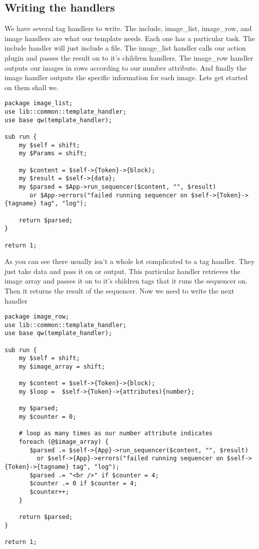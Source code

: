 \subsection{Writing the handlers}
We have several tag handlers to write. The include, image\_list, image\_row, and image handlers are what our template needs. Each one has a particular task. The include handler will just include a file. The image\_list handler calls our action plugin and passes the result on to it's children handlers. The image\_row handler outputs our images in rows according to our number attribute. And finally the image handler outputs the specific information for each image. Lets get started on them shall we.
\begin{verbatim}
package image_list;
use lib::common::template_handler;
use base qw(template_handler);

sub run {
    my $self = shift;
    my $Params = shift;
    
    my $content = $self->{Token}->{block);
    my $result = $self->{data};
    my $parsed = $App->run_sequencer($content, "", $result)
       or $App->errors("failed running sequencer on $self->{Token}->{tagname} tag", "log");
    
    return $parsed;
}

return 1;
\end{verbatim}
As you can see there usually isn't a whole lot complicated to a tag handler. They just take data and pass it on or output. This particular handler retrieves the image array and passes it on to it's children tags that it runs the sequencer on. Then it returns the result of the sequencer. Now we need to write the next handler
\begin{verbatim}
package image_row;
use lib::common::template_handler;
use base qw(template_handler);

sub run {
    my $self = shift;
    my $image_array = shift;
    
    my $content = $self->{Token}->{block);
    my $loop =  $self->{Token}->{attributes){number};

    my $parsed;
    my $counter = 0;
    
    # loop as many times as our number attribute indicates
    foreach (@$image_array) {
       $parsed .= $self->{App}->run_sequencer($content, "", $result)
         or $self->{App}->errors("failed running sequencer on $self->{Token}->{tagname} tag", "log");
       $parsed .= "<br />" if $counter = 4;
       $counter .= 0 if $counter = 4;
       $counter++;
    }

    return $parsed;
}

return 1;
\end{verbatim}
